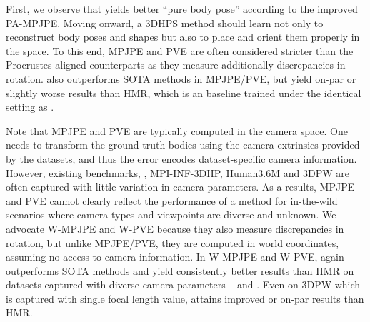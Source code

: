 \documentclass[10pt,twocolumn,letterpaper,usenames,dvipsnames]{article}
\begin{document}
First, we observe that \methodname yields better ``pure body pose'' according to the improved PA-MPJPE.
Moving onward, a 3DHPS method should learn not only to reconstruct body poses and shapes but also to place and orient them properly in the space.
To this end, MPJPE and PVE are often considered stricter than the Procrustes-aligned counterparts as they measure additionally discrepancies in rotation. 
\methodname also outperforms SOTA methods \cite{SPIN:ICCV:2019,kolotouros2019cmr,Moon_2020_ECCV_I2L-MeshNet,Rockwell2020} in MPJPE/PVE, but yield on-par or slightly worse results than HMR, which is an \iwcam baseline trained under the identical setting as \methodname.

Note that MPJPE and PVE are typically computed in the camera space. 
One needs to transform the ground truth bodies using the camera extrinsics provided by the datasets, and thus the error encodes dataset-specific camera information.
However, existing benchmarks, \eg, MPI-INF-3DHP, Human3.6M and 3DPW are often captured with little variation in camera parameters.
As a results, MPJPE and PVE cannot clearly reflect the performance of a \iwcam method for in-the-wild scenarios where camera types and viewpoints are diverse and unknown.
We advocate W-MPJPE and W-PVE because they also measure discrepancies in rotation, but unlike MPJPE/PVE, they are computed in world coordinates, assuming no access to camera information. 
In W-MPJPE and W-PVE, \methodname again outperforms SOTA methods \cite{SPIN:ICCV:2019,kolotouros2019cmr,Moon_2020_ECCV_I2L-MeshNet,Rockwell2020} and yield consistently better results than HMR on datasets captured with diverse camera parameters -- \mtpcam and \agoracam. Even on 3DPW which is captured with single focal length value, \methodname attains improved or on-par results than HMR.
\end{document}
